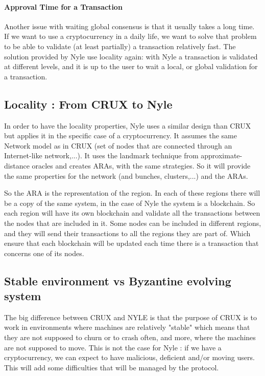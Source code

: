 \documentclass[a4paper,11pt,oneside]{report}
\begin{document}
\paragraph{Approval Time for a Transaction} \label{approve_time} Another issue
with waiting global consensus is that it usually takes a long time. If we want
to use a cryptocurrency in a daily life, we want to solve that problem to be
able to validate (at least partially) a transaction relatively fast. The
solution provided by Nyle use locality again: with Nyle a transaction is
validated at different levels, and it is up to the user to wait a local, or
global validation for a transaction.

\subsection{Locality : From CRUX to Nyle}

In order to have the locality properties, Nyle uses a similar design than CRUX
but applies it in the specific case of a cryptocurrency. It assumes the same
Network model as in CRUX (set of nodes that are connected through an
Internet-like network,...). It uses the landmark technique from
approximate-distance oracles and creates ARAs, with the same strategies. So it
will provide the same properties for the network (and bunches, clusters,...)
and the ARAs.

So the ARA is the representation of the region. In each of these regions there
will be a copy of the same system, in the case of Nyle the system is a
blockchain. So each region will have its own blockchain and validate all the
transactions between the nodes that are included in it. Some nodes can be
included in different regions, and they will send their transactions to all the
regions they are part of. Which ensure that each blockchain will be updated
each time there is a transaction that concerns one of its nodes.

\subsection{Stable environment vs Byzantine evolving system}

The big difference between CRUX and NYLE is that the purpose of CRUX is to work
in environments where machines are relatively "stable" which means that they are
not supposed to churn or to crash often, and more, where the machines are not
supposed to move. This is not the case for Nyle : if we have a cryptocurrency,
we can expect to have malicious, deficient and/or moving users. This will add
some difficulties that will be managed by the protocol.
\end{document}
